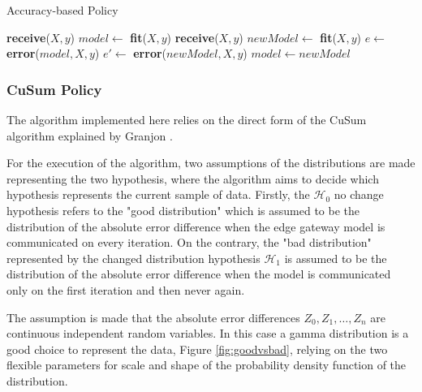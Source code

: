 \documentclass{mpaper}
\begin{document}

\begin{algorithm}[h]
\caption{Accuracy-based Policy}\label{polA}
\begin{algorithmic}
\State  \textbf{receive}($X, y$)
\State $model \gets$ \textbf{fit}($X,y$)
    \State \textbf{receive}($X, y$)
    \State $newModel \gets$ \textbf{fit}($X,y$)
    \State $e \gets$ \textbf{error}($model, X, y$)
    \State $e' \gets$ \textbf{error}($newModel, X, y$)
        \State $model \gets newModel$ 
    \EndIf
\EndWhile
\end{algorithmic}
\end{algorithm}

\subsubsection{CuSum Policy}
The algorithm implemented here relies on the direct form of the CuSum algorithm explained by Granjon \cite{cusum_pierre}.

For the execution of the algorithm, two assumptions of the distributions are made representing the two hypothesis, where the algorithm aims to decide which hypothesis represents the current sample of data. 
Firstly, the $\mathcal{H}_0$ no change hypothesis refers to the "good distribution" which is assumed to be the distribution of the absolute error difference when the edge gateway model is communicated on every iteration. On the contrary, the "bad distribution" represented by the changed distribution hypothesis $\mathcal{H}_1$ is assumed to be the distribution of the absolute error difference when the model is communicated only on the first iteration and then never again.

The assumption is made that the absolute error differences $Z_0, Z_1, \dotsc , Z_n $ are continuous independent random variables. In this case a gamma distribution is a good choice to represent the data, Figure \ref{fig:goodvsbad}, relying on the two flexible parameters for scale and shape of the probability density function of the distribution.
\end{document}
